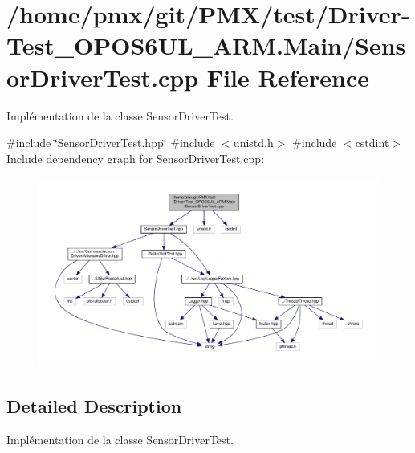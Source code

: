 \hypertarget{Driver-Test__OPOS6UL__ARM_8Main_2SensorDriverTest_8cpp}{}\section{/home/pmx/git/\+P\+M\+X/test/\+Driver-\/\+Test\+\_\+\+O\+P\+O\+S6\+U\+L\+\_\+\+A\+RM.Main/\+Sensor\+Driver\+Test.cpp File Reference}
\label{Driver-Test__OPOS6UL__ARM_8Main_2SensorDriverTest_8cpp}


Implémentation de la classe Sensor\+Driver\+Test.  


{\ttfamily \#include \char`\"{}Sensor\+Driver\+Test.\+hpp\char`\"{}}\newline
{\ttfamily \#include $<$unistd.\+h$>$}\newline
{\ttfamily \#include $<$cstdint$>$}\newline
Include dependency graph for Sensor\+Driver\+Test.\+cpp\+:
\nopagebreak
\begin{figure}[H]
\begin{center}
\leavevmode
\includegraphics[width=350pt]{Driver-Test__OPOS6UL__ARM_8Main_2SensorDriverTest_8cpp__incl}
\end{center}
\end{figure}


\subsection{Detailed Description}
Implémentation de la classe Sensor\+Driver\+Test. 

